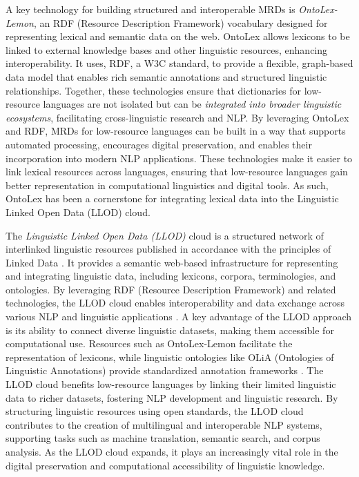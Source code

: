 A key technology for building structured and interoperable MRDs is \emph{OntoLex-Lemon}, an RDF (Resource Description Framework) vocabulary  designed for representing lexical and semantic data on the web. OntoLex allows lexicons to be linked to external knowledge bases and other linguistic resources, enhancing interoperability. It uses, RDF, a W3C standard, to provide a flexible, graph-based data model that enables rich semantic annotations and structured linguistic relationships. Together, these technologies ensure that dictionaries for low-resource languages are not isolated but can be \emph{integrated into broader linguistic ecosystems}, facilitating cross-linguistic research and NLP. By leveraging OntoLex and RDF, MRDs for low-resource languages can be built in a way that supports automated processing, encourages digital preservation, and enables their incorporation into modern NLP applications. These technologies make it easier to link lexical resources across languages, ensuring that low-resource languages gain better representation in computational linguistics and digital tools. As such, OntoLex has been a cornerstone for integrating lexical data into the Linguistic Linked Open Data (LLOD) cloud. 

The \emph{Linguistic Linked Open Data (LLOD)} cloud is a structured network of interlinked linguistic resources published in accordance with the principles of Linked Data \cite{bizer2009linked}. It provides a semantic web-based infrastructure for representing and integrating linguistic data, including lexicons, corpora, terminologies, and ontologies. By leveraging RDF (Resource Description Framework) and related technologies, the LLOD cloud enables interoperability and data exchange across various NLP and linguistic applications \cite{chiarcos2013linguistic}.  A key advantage of the LLOD approach is its ability to connect diverse linguistic datasets, making them accessible for computational use. Resources such as OntoLex-Lemon facilitate the representation of lexicons, while linguistic ontologies like OLiA (Ontologies of Linguistic Annotations) provide standardized annotation frameworks \cite{chiarcos2012olia}. The LLOD cloud benefits low-resource languages by linking their limited linguistic data to richer datasets, fostering NLP development and linguistic research. By structuring linguistic resources using open standards, the LLOD cloud contributes to the creation of multilingual and interoperable NLP systems, supporting tasks such as machine translation, semantic search, and corpus analysis. As the LLOD cloud expands, it plays an increasingly vital role in the digital preservation and computational accessibility of linguistic knowledge.  


